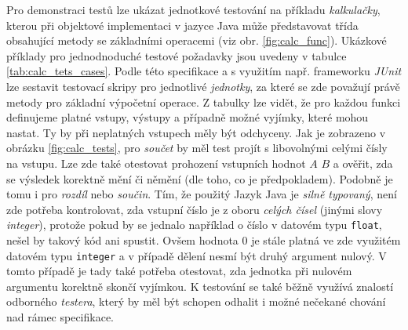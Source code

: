 \documentclass[czech, ma, kiv, he, iso690numb, pdf, viewonly]{fasthesis}
\begin{document}
    Pro demonstraci testů lze ukázat jednotkové testování na příkladu \textit{kalkulačky}, kterou při objektové implementaci v jazyce Java může představovat třída obsahující metody se základními operacemi (viz obr. \ref{fig:calc_func}). Ukázkové příklady pro jednodnoduché testové požadavky jsou uvedeny v tabulce \ref{tab:calc_tets_cases}. Podle této specifikace a s využitím např. frameworku \textit{JUnit} lze sestavit testovací skripy pro jednotlivé \emph{jednotky}, za které se zde považují právě metody pro základní výpočetní operace. Z tabulky lze vidět, že pro každou funkci definujeme platné vstupy, výstupy  a případně možné vyjímky, které mohou nastat. Ty by při neplatných vstupech měly být odchyceny. Jak je zobrazeno v obrázku \ref{fig:calc_tests}, pro \textit{součet} by měl test projít s libovolnými celými čísly na vstupu. Lze zde také otestovat prohození vstupních hodnot \(A\) \(B\) a ověřit, zda se výsledek korektně mění či němění (dle toho, co je předpokladem). Podobně je tomu i pro \textit{rozdíl} nebo \textit{součin}. Tím, že použitý Jazyk Java je \textit{silně typovaný}, není zde potřeba kontrolovat, zda vstupní číslo je z oboru \textit{celých čísel} (jinými slovy \textit{integer}), protože pokud by se jednalo například o číslo v datovém typu \verb|float|, nešel by takový kód ani spustit. Ovšem hodnota \(0\) je stále platná ve zde využitém datovém typu \verb|integer| a v případě dělení nesmí být druhý argument nulový. V tomto případě je tady také potřeba otestovat, zda jednotka při nulovém argumentu korektně skončí vyjímkou. K testování se také běžně využívá znalostí odborného \textit{testera}, který by měl být schopen odhalit i možné nečekané chování nad rámec specifikace.
\end{document}
